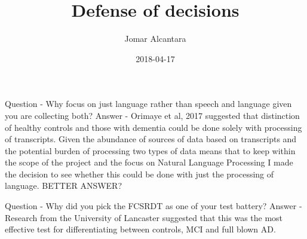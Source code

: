 \documentclass{article}
\title{Defense of decisions}
\date{2018-04-17}
\author{Jomar Alcantara}
\begin{document}
	Question - Why focus on just language rather than speech and language given you are collecting both?
	Answer - Orimaye et al, 2017 suggested that distinction of healthy controls and those with dementia could be done solely with processing of transcripts. Given the abundance of sources of data based on transcripts and the potential burden of processing two types of data means that to keep within the scope of the project and the focus on Natural Language Processing I made the decision to see whether this could be done with just the processing of language. BETTER ANSWER?
	
	Question - Why did you pick the FCSRDT as one of your test battery?
	Answer - Research from the University of Lancaster suggested that this was the most effective test for differentiating between controls, MCI and full blown AD.
\end{document}
